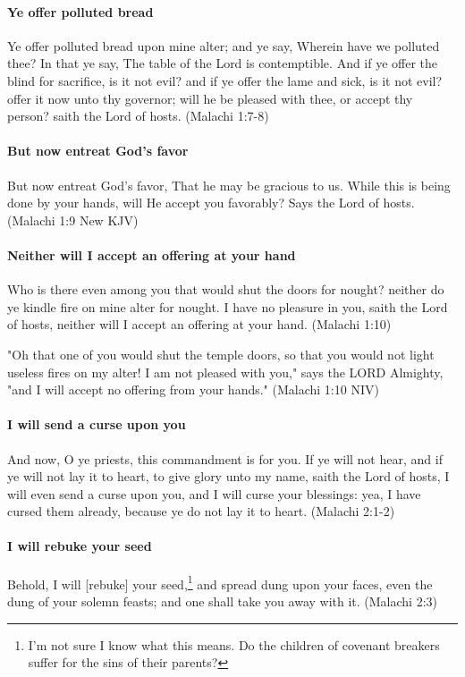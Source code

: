 \paragraph{Ye offer polluted bread}
Ye offer polluted bread upon mine alter; and ye say, Wherein have we polluted thee? In that ye say, The table of the Lord is contemptible. And if ye offer the blind for sacrifice, is it not evil? and if ye offer the lame and sick, is it not evil? offer it now unto thy governor; will he be pleased with thee, or accept thy person? saith the Lord of hosts. (Malachi 1:7-8)

\paragraph{But now entreat God's favor}
But now entreat God's favor, That he may be gracious to us. While this is being done by your hands, will He accept you favorably? Says the Lord of hosts. (Malachi 1:9 New KJV)

\paragraph{Neither will I accept an offering at your hand}
Who is there even among you that would shut the doors for nought? neither do ye kindle fire on mine alter for nought. I have no pleasure in you, saith the Lord of hosts, neither will I accept an offering at your hand. (Malachi 1:10)

"Oh that one of you would shut the temple doors, so that you would not light useless fires on my alter! I am not pleased with you," says the LORD Almighty, "and I will accept no offering from your hands." (Malachi 1:10 NIV)

\paragraph{I will send a curse upon you}
And now, O ye priests, this commandment is for you. If ye will not hear, and if ye will not lay it to heart, to give glory unto my name, saith the Lord of hosts, I will even send a curse upon you, and I will curse your blessings: yea, I have cursed them already, because ye do not lay it to heart. (Malachi 2:1-2)

\paragraph{I will rebuke your seed}
Behold, I will [rebuke] your seed,\footnote{I'm not sure I know what this means. Do the children of covenant breakers suffer for the sins of their parents?} and spread dung upon your faces, even the dung of your solemn feasts; and one shall take you away with it. (Malachi 2:3)


